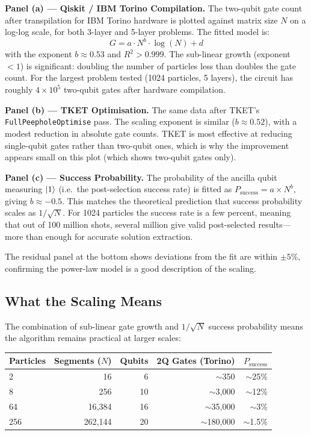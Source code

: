 \documentclass[11pt, a4paper]{article}
\begin{document}
\textbf{Panel (a) --- Qiskit / IBM Torino Compilation.} The two-qubit
gate count after transpilation for IBM Torino hardware is plotted against
matrix size $N$ on a log-log scale, for both 3-layer and 5-layer
problems. The fitted model is:
\begin{equation}
    G = a \cdot N^b \cdot \log(N) + d
\end{equation}
with the exponent $b \approx 0.53$ and $R^2 > 0.999$. The sub-linear
growth (exponent $< 1$) is significant: doubling the number of particles
less than doubles the gate count. For the largest problem tested (1024
particles, 5 layers), the circuit has roughly $4 \times 10^5$ two-qubit
gates after hardware compilation.

\textbf{Panel (b) --- TKET Optimisation.} The same data after TKET's
\texttt{FullPeepholeOptimise} pass. The scaling exponent is similar
($b \approx 0.52$), with a modest reduction in absolute gate counts. TKET
is most effective at reducing single-qubit gates rather than two-qubit
ones, which is why the improvement appears small on this plot (which
shows two-qubit gates only).

\textbf{Panel (c) --- Success Probability.} The probability of the
ancilla qubit measuring $\ket{1}$ (i.e.\ the post-selection success rate)
is fitted as $P_{\text{success}} = a \times N^b$, giving $b \approx
-0.5$. This matches the theoretical prediction that success probability
scales as $1/\sqrt{N}$. For 1024 particles the success rate is a few
percent, meaning that out of 100 million shots, several million give valid
post-selected results---more than enough for accurate solution extraction.

The residual panel at the bottom shows deviations from the fit are within
$\pm 5\%$, confirming the power-law model is a good description of the
scaling.

\subsection{What the Scaling Means}

The combination of sub-linear gate growth and $1/\sqrt{N}$ success
probability means the algorithm remains practical at larger scales:

\begin{center}
\begin{tabular}{lrrrr}
\toprule
\textbf{Particles} & \textbf{Segments ($N$)} & \textbf{Qubits} & \textbf{2Q Gates (Torino)} & \textbf{$P_{\text{success}}$} \\
\midrule
2   & 16       & 6  & $\sim$350          & $\sim$25\% \\
8   & 256      & 10 & $\sim$3{,}000      & $\sim$12\% \\
64  & 16{,}384 & 16 & $\sim$35{,}000     & $\sim$3\% \\
256 & 262{,}144 & 20 & $\sim$180{,}000   & $\sim$1.5\% \\
\bottomrule
\end{tabular}
\end{center}
\end{document}
